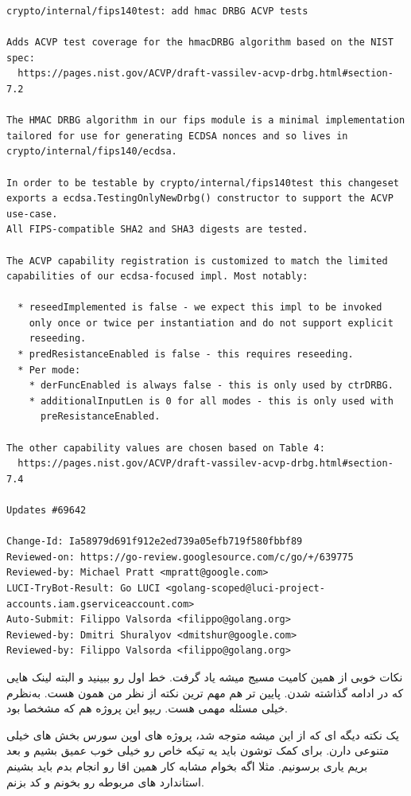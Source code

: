 \begin{latin}
\begin{verbatim}
crypto/internal/fips140test: add hmac DRBG ACVP tests

Adds ACVP test coverage for the hmacDRBG algorithm based on the NIST
spec:
  https://pages.nist.gov/ACVP/draft-vassilev-acvp-drbg.html#section-7.2

The HMAC DRBG algorithm in our fips module is a minimal implementation
tailored for use for generating ECDSA nonces and so lives in
crypto/internal/fips140/ecdsa.

In order to be testable by crypto/internal/fips140test this changeset
exports a ecdsa.TestingOnlyNewDrbg() constructor to support the ACVP use-case.
All FIPS-compatible SHA2 and SHA3 digests are tested.

The ACVP capability registration is customized to match the limited
capabilities of our ecdsa-focused impl. Most notably:

  * reseedImplemented is false - we expect this impl to be invoked
    only once or twice per instantiation and do not support explicit
    reseeding.
  * predResistanceEnabled is false - this requires reseeding.
  * Per mode:
    * derFuncEnabled is always false - this is only used by ctrDRBG.
    * additionalInputLen is 0 for all modes - this is only used with
      preResistanceEnabled.

The other capability values are chosen based on Table 4:
  https://pages.nist.gov/ACVP/draft-vassilev-acvp-drbg.html#section-7.4

Updates #69642

Change-Id: Ia58979d691f912e2ed739a05efb719f580fbbf89
Reviewed-on: https://go-review.googlesource.com/c/go/+/639775
Reviewed-by: Michael Pratt <mpratt@google.com>
LUCI-TryBot-Result: Go LUCI <golang-scoped@luci-project-accounts.iam.gserviceaccount.com>
Auto-Submit: Filippo Valsorda <filippo@golang.org>
Reviewed-by: Dmitri Shuralyov <dmitshur@google.com>
Reviewed-by: Filippo Valsorda <filippo@golang.org>
\end{verbatim}
\end{latin}

نکات خوبی از همین کامیت مسیج میشه یاد گرفت. خط اول رو ببینید و البته لینک هایی که در ادامه گذاشته شدن. پایین تر هم مهم ترین نکته از نظر من
همون  هست. به‌نظرم خیلی مسئله مهمی هست. ریپو این پروژه هم که مشخصا  بود.

یک نکته دیگه ای که از این میشه متوجه شد، پروژه های اوپن سورس بخش های خیلی متنوعی دارن. برای کمک توشون باید یه تیکه خاص رو خیلی خوب
عمیق بشیم و بعد بریم یاری برسونیم. مثلا اگه بخوام مشابه کار همین اقا رو انجام بدم باید بشینم استاندارد های مربوطه رو بخونم و کد بزنم.

